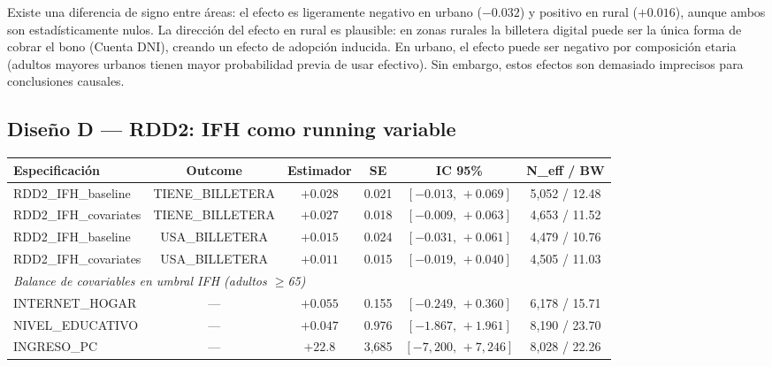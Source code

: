 \documentclass[12pt, a4paper]{article}
\begin{document}
\begin{interpcaja}
Existe una diferencia de signo entre áreas: el efecto es ligeramente
negativo en urbano ($-0.032$) y positivo en rural ($+0.016$), aunque ambos
son estadísticamente nulos. La dirección del efecto en rural es plausible:
en zonas rurales la billetera digital puede ser la única forma de cobrar el
bono (Cuenta DNI), creando un efecto de adopción inducida. En urbano, el
efecto puede ser negativo por composición etaria (adultos mayores urbanos
tienen mayor probabilidad previa de usar efectivo). Sin embargo, estos
efectos son demasiado imprecisos para conclusiones causales.
\end{interpcaja}

\subsection{Diseño D — RDD2: IFH como running variable}

\begin{center}
\begin{tabular}{lccccc}
\toprule
Especificación & Outcome & Estimador & SE & IC 95\% & N\_eff / BW \\
\midrule
RDD2\_IFH\_baseline & TIENE\_BILLETERA & $+0.028$ & 0.021 & $[-0.013,\,+0.069]$ & 5{,}052 / 12.48 \\
RDD2\_IFH\_covariates & TIENE\_BILLETERA & $+0.027$ & 0.018 & $[-0.009,\,+0.063]$ & 4{,}653 / 11.52 \\
RDD2\_IFH\_baseline & USA\_BILLETERA & $+0.015$ & 0.024 & $[-0.031,\,+0.061]$ & 4{,}479 / 10.76 \\
RDD2\_IFH\_covariates & USA\_BILLETERA & $+0.011$ & 0.015 & $[-0.019,\,+0.040]$ & 4{,}505 / 11.03 \\
\midrule
\multicolumn{6}{l}{\textit{Balance de covariables en umbral IFH (adultos $\geq$65)}} \\
INTERNET\_HOGAR & --- & $+0.055$ & 0.155 & $[-0.249,\,+0.360]$ & 6{,}178 / 15.71 \\
NIVEL\_EDUCATIVO & --- & $+0.047$ & 0.976 & $[-1.867,\,+1.961]$ & 8{,}190 / 23.70 \\
INGRESO\_PC & --- & $+22.8$ & 3{,}685 & $[-7{,}200,\,+7{,}246]$ & 8{,}028 / 22.26 \\
\bottomrule
\end{tabular}
\end{center}
\end{document}
